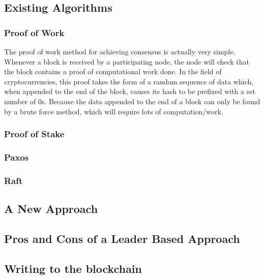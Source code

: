 \documentclass[12pt,a4paper,twoside,openright]{report}
\begin{document}
		\subsection*{Existing Algorithms}
			\subsubsection*{Proof of Work}
			The proof of work method for achieving consensus is actually very simple. 
			Whenever a block is received by a participating node, the node will check that the block contains a proof of computational work done. 
			In the field of cryptocurrencies, this proof takes the form of a random sequence of data which, when appended to the end of the block, causes its hash to be prefixed with a set number of 0s.
			Because the data appended to the end of a block can only be found by a brute force method, which will require lots of computation/work.
			\subsubsection*{Proof of Stake}
			\subsubsection*{Paxos}
			\subsubsection*{Raft}
		\subsection*{A New Approach}
			\subsection*{Pros and Cons of a Leader Based Approach}
			\subsection*{Writing to the blockchain}
\end{document}
